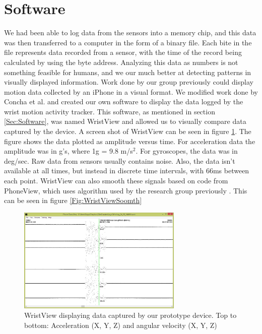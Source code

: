 \section{Software}
\label{Sec:ResultsSoftware}
We had been able to log data from the sensors into a memory chip,
and this data was then transferred to a computer in the form of a binary file.
Each bite in the file represents data recorded from a sensor,
with the time of the record being calculated by using the byte address.
Analyzing this data as numbers is not something feasible for humans,
and we our much better at detecting patterns in visually displayed information.
Work done by our group previously could display motion data collected by an iPhone in a visual format.
We modified work done by Concha et al. \cite{concha2014study} and created our own software to display the data logged by the wrist motion activity tracker.
This software, as mentioned in section \ref{Sec:Software},
was named WristView and allowed us to visually compare data captured by the device.
A screen shot of WristView can be seen in figure \ref{Fig:WristView}.
The figure shows the data plotted as amplitude versus time.
For acceleration data the amplitude was in g's, where 1g = 9.8 m/s$^2$. For gyroscopes, the data was in deg/sec.
Raw data from sensors usually contains noise.
Also, the data isn't available at all times,
but instead in discrete time intervals, with 66ms between each point.
WristView can also smooth these signals based on code from PhoneView,
which uses algorithm used by the research group previously \cite{concha2014study}.
This can be seen in figure \ref{Fig:WristViewSoomth}
\begin{figure}
\begin{center}
\includegraphics[width=0.7\textwidth]{images/WristView.jpg}
\caption{WristView displaying data captured by our prototype device. Top to bottom: Acceleration (X, Y, Z) and angular velocity (X, Y, Z)}
\label{Fig:WristView}
\end{center}
\end{figure}

